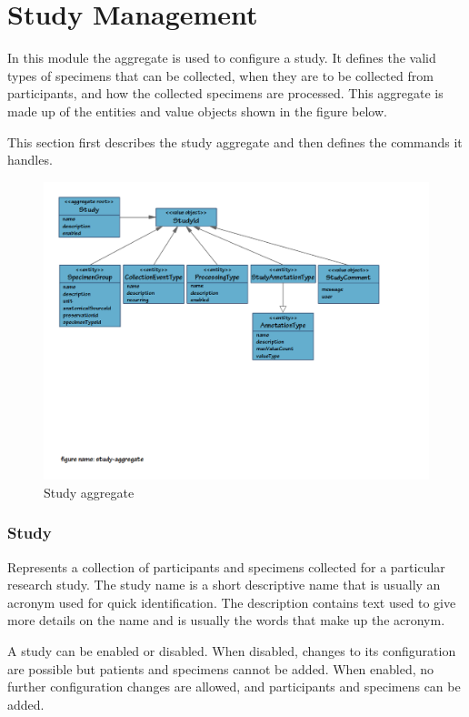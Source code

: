 \chapter{Study Management}

In this module the  aggregate is used to configure a
study. It defines the valid types of specimens that can be collected, when they
are to be collected from participants, and how the collected specimens are
processed. This aggregate is made up of the entities and value objects shown in
the figure below.

This section first describes the study aggregate and then defines the commands
it handles.

\begin{figure}[h]
  \includegraphics[trim={9mm 85mm 36mm 9mm}, clip,
    width=1\textwidth]{images/study-aggregate}
  \caption{Study aggregate}
  \label{fig:study-aggregate}
\end{figure}

\subsection*{Study}

Represents a collection of participants and specimens collected for a
particular research study. The study name is a short descriptive name that is
usually an acronym used for quick identification. The description contains text
used to give more details on the name and is usually the words that make up the
acronym.

A study can be enabled or disabled. When disabled, changes to its configuration
are possible but patients and specimens cannot be added. When enabled, no
further configuration changes are allowed, and participants and specimens can
be added.

